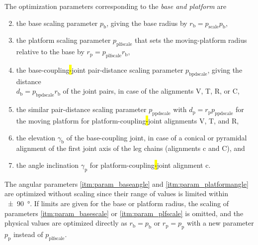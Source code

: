 The %
%
optimization parameters corresponding to the \emph{base and platform} are
\begin{enumerate}
\setcounter{enumi}{1}
\item \label{itm:param_basescale} the base scaling parameter $p_\mathrm{b}$, giving the base radius by $r_\mathrm{b}=p_\mathrm{scale} p_\mathrm{b}$,
\item \label{itm:param_plfscale} the platform scaling parameter $p_\mathrm{plfscale}$ that sets the moving-platform radius relative to the base by $r_\mathrm{p}=p_\mathrm{plfscale} r_\mathrm{b}$,
\item \label{itm:param_basepairdist} the base-coupling\hl{-}joint pair-distance scaling parameter $p_\mathrm{bpdscale}$, giving the distance\\ $d_\mathrm{b}=p_\mathrm{bpdscale} r_\mathrm{b}$ of the joint pairs, in case of the alignments V, T, R, or C, %
\item \label{itm:param_platformpairdist} the similar pair-distance scaling parameter $p_\mathrm{ppdscale}$ with $d_\mathrm{p}=r_\mathrm{p} p_\mathrm{ppdscale}$ for the moving platform for platform-coupling\hl{-}joint alignments V, T, and R,
\item \label{itm:param_baseangle} the elevation $\gamma_\mathrm{b}$ of the base-coupling joint, in case of a conical or pyramidal alignment of the first joint axis of the leg chains (alignments c and C), and
\item \label{itm:param_platformangle} the angle inclination $\gamma_\mathrm{p}$ for platform-coupling\hl{-}joint alignment c. %
\end{enumerate}
%
The %
%
angular parameters \ref*{itm:param_baseangle} and \ref*{itm:param_platformangle} %
%
are optimized without scaling since their range of values is limited within \SI{\pm 90}{\degree}.
If limits are given for the base or platform radius, the scaling of parameters \ref*{itm:param_basescale} or \ref*{itm:param_plfscale} is omitted, and the physical values are optimized directly as $r_\mathrm{b}=p_\mathrm{b}$ or $r_\mathrm{p}=p_\mathrm{p}$ with a new parameter $p_\mathrm{p}$ instead of $p_\mathrm{plfscale}$.


